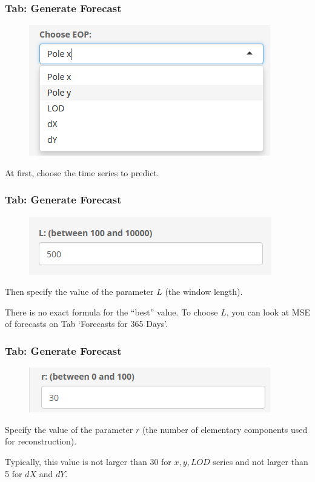 \documentclass[pdf, unicode, notheorems, xcolor={table}]{beamer}
\begin{document}
\begin{frame}\frametitle{Tab: Generate Forecast}
	\begin{figure}
		\includegraphics[width=0.9 \linewidth]{dropdown}
	\end{figure}
	At first, choose the time series to predict.
\end{frame}

\begin{frame}\frametitle{Tab: Generate Forecast}
	\begin{figure}
		\includegraphics[width=0.9 \linewidth]{parameter_L}
	\end{figure}
	Then specify the value of the parameter $ L $ (the window length).
	
	There is no exact formula for the ``best'' value. To choose $L$, you can look at MSE of forecasts on Tab `Forecasts for 365 Days'.
\end{frame}

\begin{frame}\frametitle{Tab: Generate Forecast}
	\begin{figure}
		\includegraphics[width=0.9 \linewidth]{parameter_r}
	\end{figure}
	Specify the value of the parameter $ r $ (the number of elementary components used for reconstruction).
	
	Typically, this value is not larger than 30 for $ x, y, LOD $ series and not larger than 5 for $ dX $ and $ dY $.
\end{frame}
\end{document}

